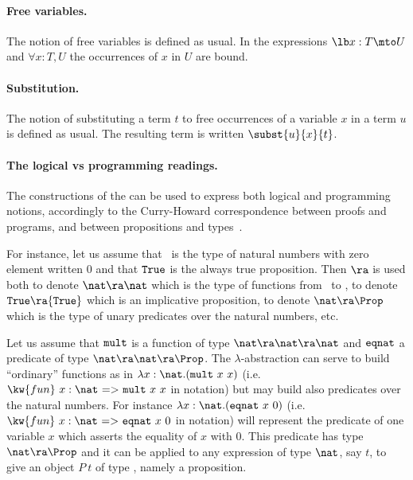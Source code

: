 \paragraph{Free variables.}
The notion of free variables is defined as usual.  In the expressions
$\lb x:T\mto U$ and $\forall x:T, U$ the occurrences of $x$ in $U$
are bound.

\paragraph[Substitution.]{Substitution.}
The notion of substituting a term $t$ to free occurrences of a
variable $x$ in a term $u$ is defined as usual. The resulting term
is written $\subst{u}{x}{t}$.

\paragraph[The logical vs programming readings.]{The logical vs programming readings.}

The constructions of the {\CIC} can be used to express both logical
and programming notions, accordingly to the Curry-Howard
correspondence between proofs and programs, and between propositions
and types~\cite{Cur58,How80,Bru72}.

For instance, let us assume that \nat\ is the type of natural numbers
with zero element written $0$ and that ${\tt True}$ is the always true
proposition.  Then $\ra$ is used both to denote $\nat\ra\nat$ which is
the type of functions from \nat\ to \nat, to denote ${\tt True}\ra{\tt
  True}$ which is an implicative proposition, to denote $\nat \ra
\Prop$ which is the type of unary predicates over the natural numbers,
etc.

Let us assume that ${\tt mult}$ is a function of type $\nat\ra\nat\ra
\nat$ and ${\tt eqnat}$ a predicate of type $\nat\ra\nat\ra \Prop$.
The $\lambda$-abstraction can serve to build ``ordinary'' functions as
in $\lambda x:\nat.({\tt mult}~x~x)$ (i.e. $\kw{fun}~x:\nat ~{\tt =>}~
{\tt mult} ~x~x$ in {\Coq} notation) but may build also predicates
over the natural numbers. For instance $\lambda x:\nat.({\tt eqnat}~
x~0)$ (i.e. $\kw{fun}~x:\nat ~{\tt =>}~ {\tt eqnat}~ x~0$ in {\Coq}
notation) will represent the predicate of one variable $x$ which
asserts the equality of $x$ with $0$. This predicate has type $\nat
\ra \Prop$ and it can be applied to any expression of type ${\nat}$,
say $t$, to give an object $P~t$ of type \Prop, namely a proposition.

